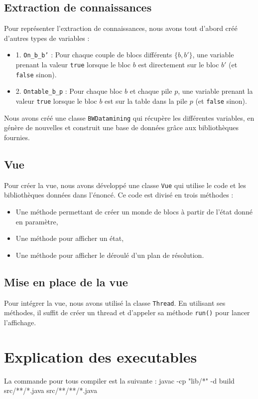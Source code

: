 \documentclass[12pt]{article}
\begin{document}
\begin{itemize}
\subsection{Extraction de connaissances}  
Pour représenter l'extraction de connaissances, nous avons tout d'abord créé d’autres types de variables :
\begin{itemize}
    \item 1. \texttt{On\_b\_b'} : Pour chaque couple de blocs différents \(\{b, b'\}\), une variable prenant la valeur \texttt{true} lorsque le bloc \(b\) est directement sur le bloc \(b'\) (et \texttt{false} sinon).
    \item 2. \texttt{Ontable\_b\_p} : Pour chaque bloc \(b\) et chaque pile \(p\), une variable prenant la valeur \texttt{true} lorsque le bloc \(b\) est sur la table dans la pile \(p\) (et \texttt{false} sinon).
\end{itemize}
Nous avons créé une classe \texttt{BWDatamining} qui récupère les différentes variables, en génère de nouvelles et construit une base de données grâce aux bibliothèques fournies.

\subsection{Vue}  
Pour créer la vue, nous avons développé une classe \texttt{Vue} qui utilise le code et les bibliothèques données dans l'énoncé. Ce code est divisé en trois méthodes :
\begin{itemize}
    \item Une méthode permettant de créer un monde de blocs à partir de l’état donné en paramètre,
    \item Une méthode pour afficher un état,
    \item Une méthode pour afficher le déroulé d’un plan de résolution.
\end{itemize}

\subsection{Mise en place de la vue}  
Pour intégrer la vue, nous avons utilisé la classe \texttt{Thread}. En utilisant ses méthodes, il suffit de créer un thread et d’appeler sa méthode \texttt{run()} pour lancer l’affichage.

        	
        \end{itemize}
        \newpage
	\section{Explication des executables}
		La commande pour tous compiler est la suivante : javac -cp "lib/*" -d build src/**/*.java src/**/**/*.java
		
\end{document}
